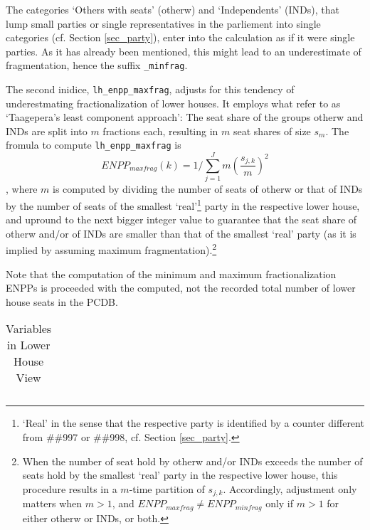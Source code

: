 The categories `Others with seats' (otherw) and `Independents' (INDs), that lump small parties or single representatives in the parliement into single categories (cf. Section \ref{sec_party}), enter into the calculation as if it were single parties. 
As it has already been mentioned, this might lead to an underestimate of fragmentation, hence the suffix \texttt{\footnotesize \_minfrag}.

The second inidice, \texttt{\footnotesize lh\_enpp\_maxfrag}, adjusts for this tendency of underestmating fractionalization of lower houses. It employs what \citet[pp.\,600-602]{Gallagher&Mitchell2005} refer to as `Taagepera's least component approach': The seat share of the groups otherw and INDs are split into $m$ fractions each, resulting in $m$ seat shares of size $s_{m}$. 
The fromula to compute \texttt{\footnotesize lh\_enpp\_maxfrag} is
\begin{equation}\label{ENPP_equ_maxfrag}
ENPP_{maxfrag}(k) = 1/\sum\limits_{j=1}^{J}m\left(\frac{s_{j,k}}{m}\right)^{2}
\end{equation} 
, where $m$ is computed by dividing the number of seats of otherw or that of INDs by the number of seats of the smallest `real'\footnote{`Real' in the sense that the respective party is identified by a counter different from \#\#997 or \#\#998, cf. Section \ref{sec_party}.} party in the respective lower house, and upround to the next bigger integer value to guarantee that the seat share of otherw and/or of INDs are smaller than that of the smallest `real' party (as it is implied by assuming maximum fragmentation).\footnote{When the number of seat hold by otherw and/or INDs exceeds the number of seats hold by the smallest `real' party in the respective lower house, this procedure results in a $m$-time partition of $s_{j,k}$. Accordingly, adjustment only matters when $m > 1$, and $ENPP_{maxfrag} ≠ ENPP_{minfrag}$ only if $m > 1$ for either otherw or INDs, or both.}

Note that the computation of the minimum and maximum fractionalization ENPPs is proceeded with the computed, not the recorded total number of lower house seats in the PCDB.

\begin{center}
\begin{longtable}{L{4cm} L{6cm} L{3cm}}
\caption{Variables in Lower House View\label{tab_view_lower_house}}


\end{longtable}
\end{center}
